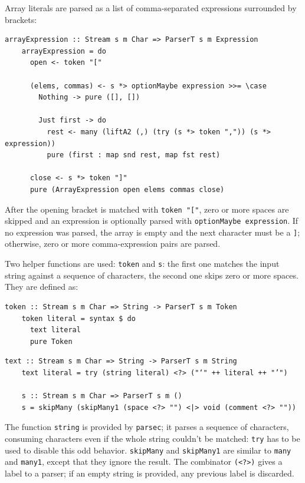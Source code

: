 \documentclass[UdineBachThesis,american,11pt]{PhdThesis}
\begin{document}
  Array literals are parsed as a list of comma-separated expressions surrounded
  by brackets:

  \begin{Verbatim}[gobble=4,fontsize=\small]
    arrayExpression :: Stream s m Char => ParserT s m Expression
    arrayExpression = do
      open <- token "["

      (elems, commas) <- s *> optionMaybe expression >>= \case
        Nothing -> pure ([], [])

        Just first -> do
          rest <- many (liftA2 (,) (try (s *> token ",")) (s *> expression))
          pure (first : map snd rest, map fst rest)

      close <- s *> token "]"
      pure (ArrayExpression open elems commas close)
  \end{Verbatim}

  After the opening bracket is matched with \mbox{\texttt{token "["}}, zero or
  more spaces are skipped and an expression is optionally parsed with
  \mbox{\texttt{optionMaybe expression}}. If no expression was parsed, the array
  is empty and the next character must be a \texttt{]}; otherwise, zero or more
  comma-expression pairs are parsed.

  Two helper functions are used: \mbox{\texttt{token}} and \texttt{s}: the first
  one matches the input string against a sequence of characters, the second one
  skips zero or more spaces. They are defined as:

  \begin{Verbatim}[gobble=4,fontsize=\small]
    token :: Stream s m Char => String -> ParserT s m Token
    token literal = syntax $ do
      text literal
      pure Token
  \end{Verbatim}

  \pagebreak

  \begin{Verbatim}[gobble=4,fontsize=\small]
    text :: Stream s m Char => String -> ParserT s m String
    text literal = try (string literal) <?> ("‘" ++ literal ++ "’")

    s :: Stream s m Char => ParserT s m ()
    s = skipMany (skipMany1 (space <?> "") <|> void (comment <?> ""))
  \end{Verbatim}

  The function \mbox{\texttt{string}} is provided by \mbox{\texttt{parsec}}; it
  parses a sequence of characters, consuming characters even if the whole string
  couldn't be matched: \mbox{\texttt{try}} has to be used to disable this odd
  behavior. \mbox{\texttt{skipMany}} and \mbox{\texttt{skipMany1}} are similar
  to \mbox{\texttt{many}} and \mbox{\texttt{many1}}, except that they ignore the
  result. The combinator \mbox{\texttt{(<?>)}} gives a label to a parser; if an
  empty string is provided, any previous label is discarded.
\end{document}
